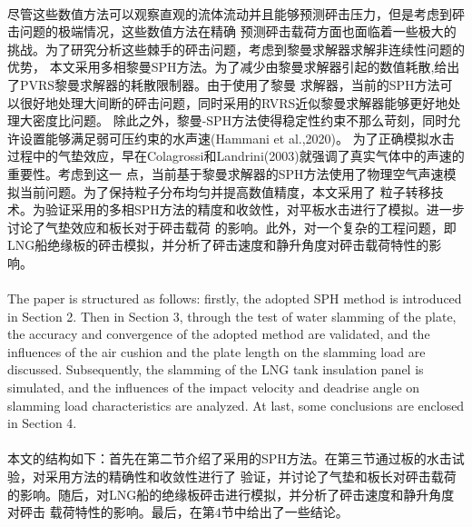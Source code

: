 \documentclass[UTF8]{ctexart}
\begin{document}
\paragraph{\quad}尽管这些数值方法可以观察直观的流体流动并且能够预测砰击压力，但是考虑到砰击问题的极端情况，这些数值方法在精确
                预测砰击载荷方面也面临着一些极大的挑战。为了研究分析这些棘手的砰击问题，考虑到黎曼求解器求解非连续性问题的优势，
                本文采用多相黎曼SPH方法。为了减少由黎曼求解器引起的数值耗散,给出了PVRS黎曼求解器的耗散限制器。由于使用了黎曼
                求解器，当前的SPH方法可以很好地处理大间断的砰击问题，同时采用的RVRS近似黎曼求解器能够更好地处理大密度比问题。
                除此之外，黎曼-SPH方法使得稳定性约束不那么苛刻，同时允许设置能够满足弱可压约束的水声速(Hammani et al.,2020)。
                为了正确模拟水击过程中的气垫效应，早在Colagrossi和Landrini(2003)就强调了真实气体中的声速的重要性。考虑到这一
                点，当前基于黎曼求解器的SPH方法使用了物理空气声速模拟当前问题。为了保持粒子分布均匀并提高数值精度，本文采用了
                粒子转移技术。为验证采用的多相SPH方法的精度和收敛性，对平板水击进行了模拟。进一步讨论了气垫效应和板长对于砰击载荷
                的影响。此外，对一个复杂的工程问题，即LNG船绝缘板的砰击模拟，并分析了砰击速度和静升角度对砰击载荷特性的影响。
\paragraph{\quad}The paper is structured as follows: firstly, the adopted SPH method is introduced in 
                Section 2. Then in Section 3, through the test of water slamming of the plate, the 
                accuracy and convergence of the adopted method are validated, and the influences of 
                the air cushion and the plate length on the slamming load are discussed. Subsequently, 
                the slamming of the LNG tank insulation panel is simulated, and the influences of the 
                impact velocity and deadrise angle on slamming load characteristics are analyzed. At 
                last, some conclusions are enclosed in Section 4.
\paragraph{\quad}本文的结构如下：首先在第二节介绍了采用的SPH方法。在第三节通过板的水击试验，对采用方法的精确性和收敛性进行了
                验证，并讨论了气垫和板长对砰击载荷的影响。随后，对LNG船的绝缘板砰击进行模拟，并分析了砰击速度和静升角度对砰击
                载荷特性的影响。最后，在第4节中给出了一些结论。
\end{document}
